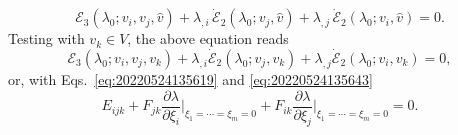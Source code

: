 \documentclass[12pt, final]{scrartcl}
\theoremstyle{definition}
\newcommand{\E}{\mathcal E}
\begin{document}


\begin{equation}
    \E_3(\lambda_0; v_i , v_j, \hat{v}) + \lambda_{,i} \, \dot{\E}_2(\lambda_0; v_j, \hat{v}) + \lambda_{,j} \, \dot{\E}_2(\lambda_0; v_i, \hat{v}) = 0.
\end{equation}
Testing with $v_k \in V$, the above equation reads
\begin{equation}
  \E_3(\lambda_0; v_i , v_j, v_k) + \lambda_{,i} \dot{\E}_2(\lambda_0; v_j, v_k) + \lambda_{,j} \dot{\E}_2(\lambda_0; v_i, v_k) = 0,
\end{equation}
or, with Eqs.~\eqref{eq:20220524135619} and \eqref{eq:20220524135643}
\begin{equation}
  \label{eq:20220902125031}
  E_{ijk} +  F_{jk} \frac{\partial\lambda}{\partial\xi_i} \biggr\rvert_{\xi_1 = \cdots = \xi_m = 0} + F_{ik} \frac{\partial\lambda}{\partial\xi_j} \biggr\rvert_{\xi_1 = \cdots = \xi_m = 0} = 0.
\end{equation}
\end{document}
